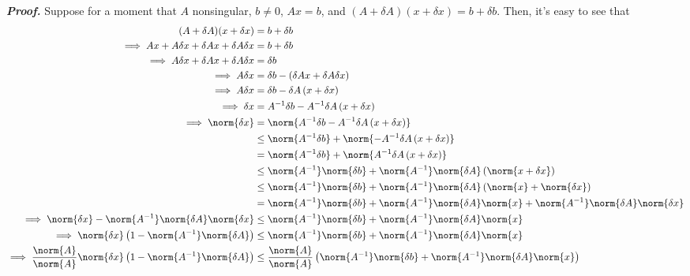 \documentclass{report}
\begin{document}
        \bigbreak \noindent 
        \textbf{\textit{Proof.}} Suppose for a moment that $A$ nonsingular, $b\ne 0$, $Ax= b$, and $(A + \delta A)(x + \delta x) = b + \delta b$. Then, it's easy to see that
        \begin{align*}
            (A+\delta A)(x + \delta x) &= b + \delta b \\
            \implies Ax + A\delta x + \delta Ax + \delta A \delta x &= b + \delta b\\
            \implies A\delta x + \delta Ax + \delta A \delta x &= \delta b\\
            \implies A\delta x &= \delta b - (\delta Ax + \delta A \delta x) \\
            \implies A\delta x &= \delta b - \delta A\left(x + \delta x\right) \\
            \implies \delta x &= A^{-1} \delta b - A^{-1}\delta A\left(x+\delta x\right) \\
            \implies \norm{\delta x} &= \norm{A^{-1}\delta b -A^{-1}\delta A\left(x + \delta x\right)} \\
                                     &\leq\norm{A^{-1}\delta b} + \norm{-A^{-1} \delta A\left(x + \delta x\right)} \\
                                     &=\norm{A^{-1}\delta b} + \norm{A^{-1} \delta A\left(x + \delta x\right)}  \\
                                     &\leq \norm{A^{-1}}\norm{\delta b} + \norm{A^{-1}}\norm{\delta A}\left(\norm{x + \delta x}\right) \\
                                     &\leq \norm{A^{-1}}\norm{\delta b} + \norm{A^{-1}}\norm{\delta A}\left(\norm{x} + \norm{\delta x}\right) \\
                                     &=\norm{A^{-1}}\norm{\delta b} + \norm{A^{-1}}\norm{\delta A}\norm{x} + \norm{A^{-1}}\norm{\delta A}\norm{\delta x} \\
            \implies \norm{\delta x} - \norm{A^{-1}}\norm{\delta A}\norm{\delta x} &\leq \norm{A^{-1}}\norm{\delta b} + \norm{A^{-1}}\norm{\delta A}\norm{x} \\
            \implies \norm{\delta x}\left(1-\norm{A^{-1}}\norm{\delta A}\right) &\leq \norm{A^{-1}}\norm{\delta b} + \norm{A^{-1}}\norm{\delta A}\norm{x} \\
            \implies \frac{\norm{A}}{\norm{A}}\norm{\delta x} \left(1-\norm{A^{-1}}\norm{\delta A}\right) &\leq \frac{\norm{A}}{\norm{A}}\left(\norm{A^{-1}}\norm{\delta b} + \norm{A^{-1}}\norm{\delta A}\norm{x}\right) \\

\end{align*}
\end{document}

